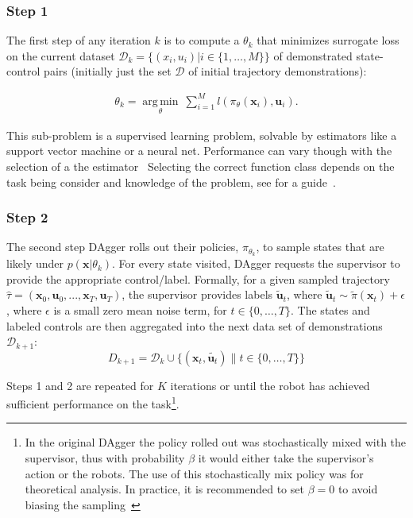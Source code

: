 \documentclass[10pt, conference]{ieeeconf}      %
\DeclareMathOperator*{\argmin}{arg\,min}
\newcommand{\bu}{\mathbf{u}}
\newcommand{\bx}{\mathbf{x}}
\newcommand{\fpnote}[1]{\ifthenelse{ \boolean{include-notes}}%
 {\textcolor{blue}{\textbf{FP: #1}}}{}}
\begin{document}
 
\subsubsection{Step 1}
The first step of any iteration $k$ is to compute a $\theta_k$ that minimizes surrogate loss on the current dataset $\mathcal{D}_k=\{(x_i,u_i)|i\in\{1,\ldots,M\}\}$ of demonstrated state-control pairs (initially just the set $\mathcal{D}$ of initial trajectory demonstrations):

 \vspace{-1ex}
\begin{align}\label{eq:super_objj}
\theta_{k} = \underset{\theta}{\argmin} \: \sum_{i=1}^{M} l(\pi_{\theta}(\bx_i),\bu_i).
\end{align}

This sub-problem is a supervised learning problem, solvable by estimators like a support vector machine or a neural net. Performance can vary though with the selection of a the estimator~ Selecting the correct function class depends on the task being consider and knowledge of the problem, see for a guide~\cite{scholkopf2002learning}. 
 

 \subsubsection{Step 2}
The second step  DAgger rolls out their policies, $\pi_{\theta_{k}}$, to sample states that are likely under $p(\bx|\theta_{k})$.  For every state visited, DAgger requests the supervisor to provide the appropriate control/label. Formally, for a given sampled trajectory  $\hat{\tau} = (\bx_0,\bu_0,...,\bx_T,\bu_T )$, the supervisor provides labels $\tilde{\bu}_t$, where $\tilde{\bu}_t \sim \tilde{\pi}(\bx_t) + \epsilon$, where $\epsilon$ is a small zero mean noise term, for $t\in \{0, \ldots, T\}$.
The states and labeled controls are then aggregated into the next data set of demonstrations $\mathcal{D}_{k+1}$:
$$D_{k+1}=\mathcal{D}_k \cup \{(\bx_t,\tilde{\bu_t})\|t\in\{0,\ldots,T\}\} $$

Steps 1 and 2 are repeated for $K$ iterations or until 
the robot has achieved sufficient performance on the task\footnote{In the original DAgger the policy rolled out
was stochastically mixed with the supervisor, thus with probability $\beta$ it would either take the supervisor's action
or the robots. The use of this stochastically mix policy was for theoretical analysis. In practice, it is recommended
to set $\beta = 0$ to avoid biasing the sampling~\cite{NIPS2014_5421,ross2010reduction}}.
\end{document}
